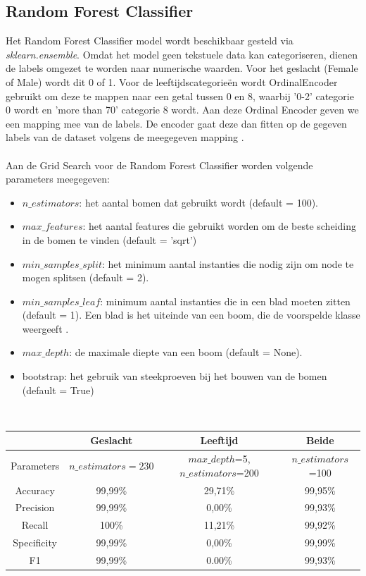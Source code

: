 \subsection{Random Forest Classifier} \label{sub:poc-rfc}
Het Random Forest Classifier model wordt beschikbaar gesteld via \textit{sklearn.ensemble}.
Omdat het model geen tekstuele data kan categoriseren, dienen de labels omgezet te worden naar numerische waarden. Voor het geslacht (Female of Male) wordt dit 0 of 1. Voor de leeftijdscategorieën wordt OrdinalEncoder gebruikt om deze te mappen naar een getal tussen 0 en 8, waarbij '0-2' categorie 0 wordt en 'more than 70' categorie 8 wordt. Aan deze Ordinal Encoder geven we een mapping mee van de labels. De encoder gaat deze dan fitten op de gegeven labels van de dataset volgens de meegegeven mapping \autocite{ScikitLearn2024}.  \\
\\
Aan de Grid Search voor de Random Forest Classifier worden volgende parameters meegegeven:
\begin{itemize}
    \item $n\_estimators$: het aantal bomen dat gebruikt wordt (default = 100). 
    \item $max\_features$: het aantal features die gebruikt worden om de beste scheiding in de bomen te vinden (default = 'sqrt')
    \item $min\_samples\_split$: het minimum aantal instanties die nodig zijn om node te mogen splitsen (default = 2).
    \item $min\_samples\_leaf$: minimum aantal instanties die in een blad moeten zitten (default = 1). Een blad is het uiteinde van een boom, die de voorspelde klasse weergeeft \textcite{Garg2020}. 
    \item $max\_depth$: de maximale diepte van een boom (default = None). 
    \item bootstrap: het gebruik van steekproeven bij het bouwen van de bomen (default = True)
\end{itemize}
\\
\begin{center}
    \begin{tabular}{||c | c  | c | c||} 
        \hline
          & Geslacht & Leeftijd & Beide  \\ 
        \hline
        Parameters & $n\_estimators=230$ & $max\_depth$=5, $n\_estimators$=200 & $n\_estimators$=100  \\ 
        \hline
        Accuracy & 99,99\% & 29,71\% & 99,95\%  \\
        \hline
        Precision & 99,99\% & 0,00\% & 99,93\%  \\
        \hline
        Recall & 100\% & 11,21\% & 99,92\%  \\
        \hline
        Specificity & 99,99\% & 0,00\% & 99,99\% \\
        \hline
        F1 & 99,99\% & 0.00\% & 99,93\%  \\
    \end{tabular}
\end{center}
